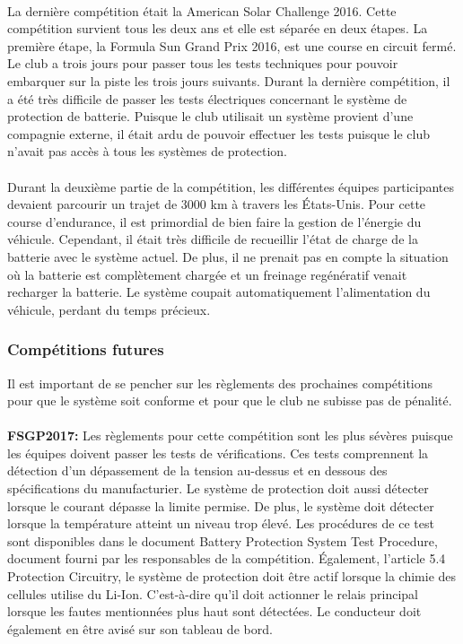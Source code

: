 		\paragraph{}
		La dernière compétition était la American Solar Challenge 2016. Cette compétition survient tous les deux ans et elle est séparée en deux étapes. La première étape, la Formula Sun Grand Prix 2016, est une course en circuit fermé. Le club a trois jours pour passer tous les tests techniques pour pouvoir embarquer sur la piste les trois jours suivants. Durant la dernière compétition, il a été très difficile de passer les tests électriques concernant le système de protection de batterie. Puisque le club utilisait un système provient d'une compagnie externe, il était ardu de pouvoir effectuer les tests puisque le club n'avait pas accès à tous les systèmes de protection.
		
		\paragraph{}
		Durant la deuxième partie de la compétition, les différentes équipes participantes devaient parcourir un trajet de 3000 km à travers les États-Unis. Pour cette course d'endurance, il est primordial de bien faire la gestion de l'énergie du véhicule. Cependant, il était très difficile de recueillir l'état de charge de la batterie avec le système actuel. De plus, il ne prenait pas en compte la situation où la batterie est complètement chargée et un freinage regénératif venait recharger la batterie. Le système coupait automatiquement l'alimentation du véhicule, perdant du temps précieux.

		
	\subsubsection{Compétitions futures}
		Il est important de se pencher sur les règlements des prochaines compétitions pour que le système soit conforme et pour que le club ne subisse pas de pénalité.
		
		\paragraph{}
		\textbf{FSGP2017:} Les règlements pour cette compétition sont les plus sévères puisque les équipes doivent passer les tests de vérifications. Ces tests comprennent la détection d'un dépassement de la tension au-dessus et en dessous des spécifications du manufacturier. Le système de protection doit aussi détecter lorsque le courant dépasse la limite permise. De plus, le système doit détecter lorsque la température atteint un niveau trop élevé. Les procédures de ce test sont disponibles dans le document Battery Protection System Test Procedure, document fourni par les responsables de la compétition. Également, l'article 5.4 Protection Circuitry, le système de protection doit être actif lorsque la chimie des cellules utilise du Li-Ion. C'est-à-dire qu'il doit actionner le relais principal lorsque les fautes mentionnées plus haut sont détectées. Le conducteur doit également en être avisé sur son tableau de bord. \cite{reg_fsgp2017}
		
